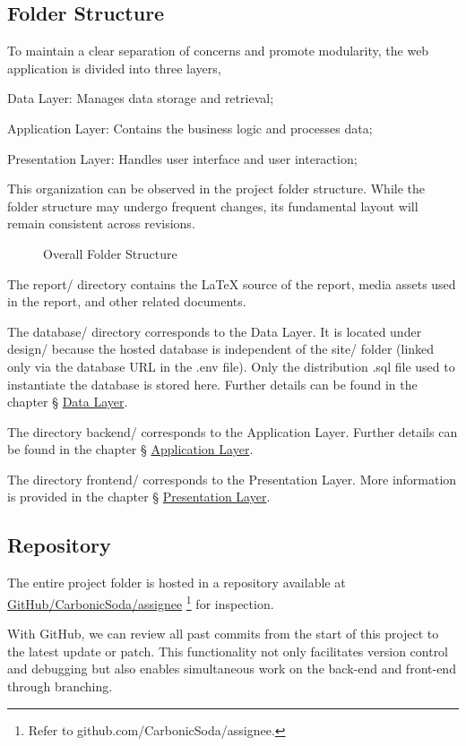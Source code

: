 \documentclass[12pt]{report}
\newcommand{\n}{\par}
\newcommand{\br}{\n\vspace{1 em}\n}
\begin{document}
\subsection{Folder Structure} \label{overview.project-structure.folder-structure}
To maintain a clear separation of concerns and promote modularity, the web application is divided into three layers,\n
Data Layer: Manages data storage and retrieval;\n
Application Layer: Contains the business logic and processes data;\n
Presentation Layer: Handles user interface and user interaction;
\br
This organization can be observed in the project folder structure.
While the folder structure may undergo frequent changes, its fundamental layout will remain consistent across revisions.
\newpage
\begin{figure}[ht!]
	\centering
	\begin{minipage}{0.3\linewidth}
	\end{minipage}
	\caption{Overall Folder Structure}
	\label{fig:overview-folder-structure}
\end{figure}
The report/ directory contains the \LaTeX{} source of the report, media assets used in the report, and other related documents.
\br
The database/ directory corresponds to the Data Layer.
It is located under design/ because the hosted database is independent of the site/ folder (linked only via the database URL in the .env file).
Only the distribution .sql file used to instantiate the database is stored here.
Further details can be found in the chapter \S{} \hyperref[data-layer]{Data Layer}.
\br
The directory backend/ corresponds to the Application Layer.
Further details can be found in the chapter \S{} \hyperref[application-layer]{Application Layer}.
\br
The directory frontend/ corresponds to the Presentation Layer.
More information is provided in the chapter \S{} \hyperref[presentation-layer]{Presentation Layer}.


\subsection{Repository} \label{overview.project-structure.repository}
The entire project folder is hosted in a repository available at
\href{https://github.com/CarbonicSoda/assignee}{GitHub/CarbonicSoda/assignee}
\footnote{Refer to github.com/CarbonicSoda/assignee.}
for inspection.
\br
With GitHub, we can review all past commits from the start of this project to the latest update or patch.
This functionality not only facilitates version control and debugging but also enables simultaneous work on the back-end and front-end through branching.
\end{document}
